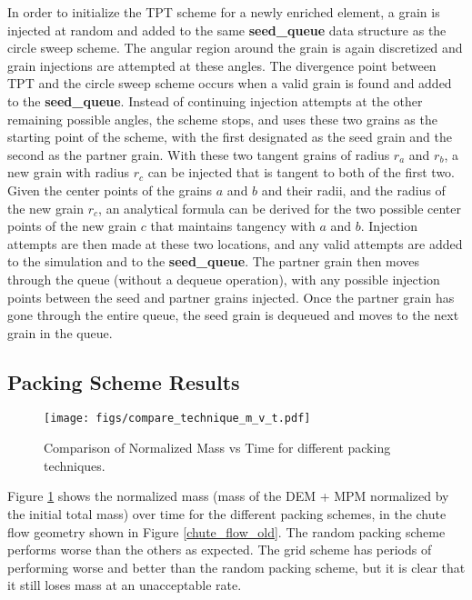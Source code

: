 In order to initialize the TPT scheme for a newly enriched element, a grain is injected at random and added to the same \textbf{seed\_queue} data structure as the circle sweep scheme. The angular region around the grain is again discretized and grain injections are attempted at these angles. The divergence point between TPT and the circle sweep scheme occurs when a valid grain is found and added to the \textbf{seed\_queue}. Instead of continuing injection attempts at the other remaining possible angles, the scheme stops, and uses these two grains as the starting point of the scheme, with the first designated as the seed grain and the second as the partner grain. With these two tangent grains of radius $r_a$ and $r_b$, a new grain with radius $r_c$ can be injected that is tangent to both of the first two. Given the center points of the grains $a$ and $b$ and their radii, and the radius of the new grain $r_c$, an analytical formula can be derived for the two possible center points of the new grain $c$ that maintains tangency with $a$ and $b$. Injection attempts are then made at these two locations, and any valid attempts are added to the simulation and to the \textbf{seed\_queue}. The partner grain then moves through the queue (without a dequeue operation), with any possible injection points between the seed and partner grains injected. Once the partner grain has gone through the entire queue, the seed grain is dequeued and moves to the next grain in the queue.

\subsection{Packing Scheme Results}

\begin{figure}[htp] 
    \centering
    \texttt{[image: figs/compare\_technique\_m\_v\_t.pdf]}
    \caption{Comparison of Normalized Mass vs Time for different packing techniques.}
    \label{packing_compare}
\end{figure}

Figure \ref{packing_compare} shows the normalized mass (mass of the DEM + MPM normalized by the initial total mass) over time for the different packing schemes, in the chute flow geometry shown in Figure \ref{chute_flow_old}. The random packing scheme performs worse than the others as expected. The grid scheme has periods of performing worse and better than the random packing scheme, but it is clear that it still loses mass at an unacceptable rate.

